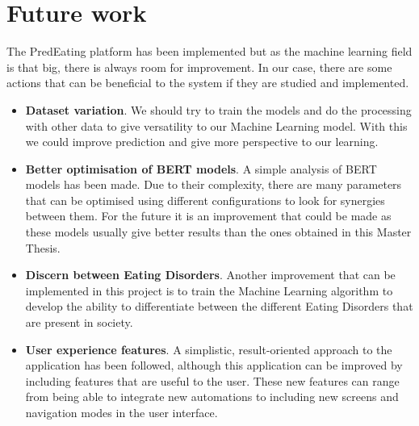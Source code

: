 \section{Future work}
The PredEating platform has been implemented but as the machine learning field is that big, there is always room for improvement. In our case, there are some actions that can be beneficial to the system if they are studied and implemented.
\begin{itemize}
    \item \textbf{Dataset variation}. We should try to train the models and do the processing with other data to give versatility to our Machine Learning model. With this we could improve prediction and give more perspective to our learning.
    \item \textbf{Better optimisation of BERT models}. A simple analysis of BERT models has been made. Due to their complexity, there are many parameters that can be optimised using different configurations to look for synergies between them. For the future it is an improvement that could be made as these models usually give better results than the ones obtained in this Master Thesis.
    \item \textbf{Discern between Eating Disorders}. Another improvement that can be implemented in this project is to train the Machine Learning algorithm to develop the ability to differentiate between the different Eating Disorders that are present in society.
    \item \textbf{User experience features}. A simplistic, result-oriented approach to the application has been followed, although this application can be improved by including features that are useful to the user. These new features can range from being able to integrate new automations to including new screens and navigation modes in the user interface.
\end{itemize}

